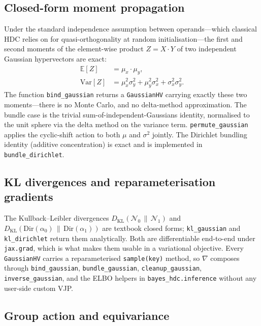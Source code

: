 \documentclass[twoside,11pt]{article}
\begin{document}
\subsection{Closed-form moment propagation}

Under the standard independence assumption between operands---which classical HDC relies on for quasi-orthogonality at random initialisation---the first and second moments of the element-wise product $Z = X \cdot Y$ of two independent Gaussian hypervectors are exact:
\begin{align}
\mathbb{E}[Z] &= \mu_x \cdot \mu_y, \\
\mathrm{Var}[Z] &= \mu_x^2 \sigma_y^2 + \mu_y^2 \sigma_x^2 + \sigma_x^2 \sigma_y^2.
\end{align}
The function \texttt{bind\_gaussian} returns a \texttt{GaussianHV} carrying exactly these two moments---there is no Monte Carlo, and no delta-method approximation. The bundle case is the trivial sum-of-independent-Gaussians identity, normalised to the unit sphere via the delta method on the variance term. \texttt{permute\_gaussian} applies the cyclic-shift action to both $\mu$ and $\sigma^2$ jointly. The Dirichlet bundling identity (additive concentration) is exact and is implemented in \texttt{bundle\_dirichlet}.

\subsection{KL divergences and reparameterisation gradients}

The Kullback--Leibler divergences $D_{\mathrm{KL}}(\mathcal{N}_0 \,\|\, \mathcal{N}_1)$ and $D_{\mathrm{KL}}(\mathrm{Dir}(\alpha_0) \,\|\, \mathrm{Dir}(\alpha_1))$ are textbook closed forms; \texttt{kl\_gaussian} and \texttt{kl\_dirichlet} return them analytically. Both are differentiable end-to-end under \texttt{jax.grad}, which is what makes them usable in a variational objective. Every \texttt{GaussianHV} carries a reparameterised \texttt{sample(key)} method, so $\nabla$ composes through \texttt{bind\_gaussian}, \texttt{bundle\_gaussian}, \texttt{cleanup\_gaussian}, \texttt{inverse\_gaussian}, and the ELBO helpers in \texttt{bayes\_hdc.inference} without any user-side custom VJP.

\subsection{Group action and equivariance}
\label{sec:equivariance}
\end{document}
